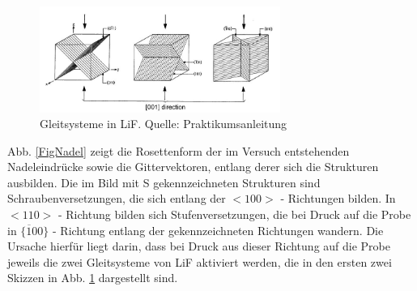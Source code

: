 	\begin{figure}[H]
            \centering
            \includegraphics[width=0.7\textwidth]{Images/Gleitsysteme.JPG}
            \caption{Gleitsysteme in LiF. Quelle: Praktikumsanleitung}
            \label{FigGleitGel}
        \end{figure}
	
	Abb. \ref{FigNadel} zeigt die Rosettenform der im Versuch entstehenden Nadeleindrücke sowie die Gittervektoren, entlang derer sich die Strukturen ausbilden. 
	Die im Bild mit S gekennzeichneten Strukturen sind Schraubenversetzungen, die sich entlang der $<100>$ - Richtungen bilden. In $<110>$ - Richtung bilden sich
	Stufenversetzungen, die bei Druck auf die Probe in $\{ \overline{1}00\}$ - Richtung entlang der gekennzeichneten Richtungen wandern. Die Ursache hierfür liegt
	darin, dass bei Druck aus dieser Richtung auf die Probe jeweils die zwei Gleitsysteme von LiF aktiviert werden, die in den ersten zwei Skizzen in Abb. 
	\ref{FigGleitGel} dargestellt sind.
	


